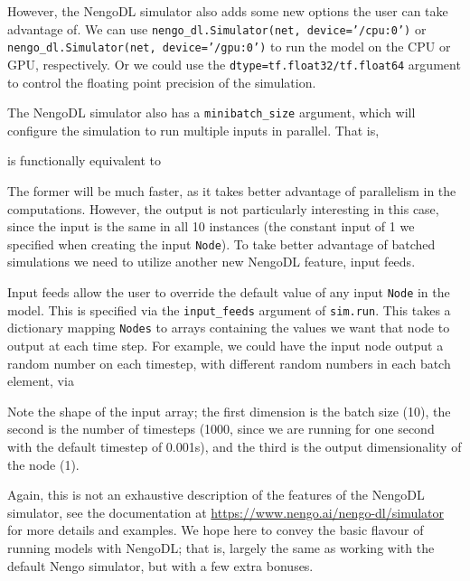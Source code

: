 \documentclass{article}
\begin{document}
However, the NengoDL simulator also adds some new options the user can take advantage of.  We can use \texttt{nengo\_dl.Simulator(net, device='/cpu:0')} or \texttt{nengo\_dl.Simulator(net, device='/gpu:0')} to run the model on the CPU or GPU, respectively.  Or we could use the \texttt{dtype=tf.float32/tf.float64} argument to control the floating point precision of the simulation.

The NengoDL simulator also has a \texttt{minibatch\_size} argument, which will configure the simulation to run multiple inputs in parallel.  That is,

\lstset{numbers=none}


is functionally equivalent to



The former will be much faster, as it takes better advantage of parallelism in the computations.  However, the output is not particularly interesting in this case, since the input is the same in all 10 instances (the constant input of 1 we specified when creating the input \texttt{Node}).  To take better advantage of batched simulations we need to utilize another new NengoDL feature, input feeds.

Input feeds allow the user to override the default value of any input \texttt{Node} in the model.  This is specified via the \texttt{input\_feeds} argument of \texttt{sim.run}.  This takes a dictionary mapping \texttt{Nodes} to arrays containing the values we want that node to output at each time step.  For example, we could have the input node output a random number on each timestep, with different random numbers in each batch element, via



Note the shape of the input array; the first dimension is the batch size (10), the second is the number of timesteps (1000, since we are running for one second with the default timestep of 0.001s), and the third is the output dimensionality of the node (1).

Again, this is not an exhaustive description of the features of the NengoDL simulator, see the documentation at \url{https://www.nengo.ai/nengo-dl/simulator} for more details and examples.  We hope here to convey the basic flavour of running models with NengoDL; that is, largely the same as working with the default Nengo simulator, but with a few extra bonuses.
\end{document}
